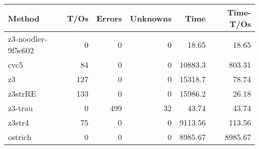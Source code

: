 \begin{tabular}{lrrrrr}
\hline
 Method             &   T/Os &   Errors &   Unknowns &     Time &   Time-T/Os \\
\hline
 z3-noodler-9f5e602 &      0 &        0 &          0 &    18.65 &       18.65 \\
 cvc5               &     84 &        0 &          0 & 10883.3  &      803.31 \\
 z3                 &    127 &        0 &          0 & 15318.7  &       78.74 \\
 z3strRE            &    133 &        0 &          0 & 15986.2  &       26.18 \\
 z3-trau            &      0 &      499 &         32 &    43.74 &       43.74 \\
 z3str4             &     75 &        0 &          0 &  9113.56 &      113.56 \\
 ostrich            &      0 &        0 &          0 &  8985.67 &     8985.67 \\
\hline
\end{tabular}
